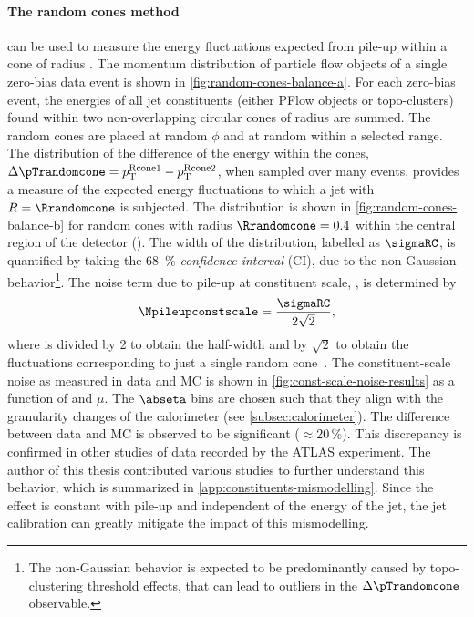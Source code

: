 \paragraph{The random cones method} can be used to measure the energy fluctuations expected from pile-up within a cone of radius \Rrandomcone. The momentum distribution of particle flow objects of a single zero-bias data event is shown in \cref{fig:random-cones-balance-a}.
For each zero-bias event, the energies of all jet constituents (either PFlow objects or topo-clusters) found within two non-overlapping circular cones of radius \Rrandomcone are summed.
The random cones are placed at random $\phi$ and at random \abseta within a selected range.
The distribution of the difference of the energy within the cones, $\Delta \pTrandomcone = p_{\text{T}}^{\text{Rcone1}} - p_{\text{T}}^\text{Rcone2}$, when sampled over many events, provides a measure of the expected energy fluctuations to which a jet with $R = \Rrandomcone$ is subjected.
The distribution is shown in \cref{fig:random-cones-balance-b} for random cones with radius $\Rrandomcone = 0.4$ within the central region of the detector (). The width of the distribution, labelled as $\sigmaRC$, is quantified by taking the \SI{68}{\percent} \emph{confidence interval} (CI), due to the non-Gaussian behavior\footnote{The non-Gaussian behavior is expected to be predominantly caused by topo-clustering threshold effects, that can lead to outliers in the $\Delta \pTrandomcone$ observable.}.
The noise term due to pile-up at constituent scale, \Npileupconstscale, is determined by
\begin{equation}
    \Npileupconstscale = \frac{\sigmaRC}{2\sqrt{2}},
\end{equation}
where \sigmaRC is divided by 2 to obtain the half-width and by $\sqrt{2}$ to obtain the fluctuations corresponding to just a single random cone~\cite{JETM-2018-05}.
The constituent-scale noise as measured in data and MC is shown in \cref{fig:const-scale-noise-results} as a function of \abseta and $\mu$.
The $\abseta$ bins are chosen such that they align with the granularity changes of the calorimeter (see \cref{subsec:calorimeter}). 
The difference between data and MC is observed to be significant ($\approx 20\,\%$). This discrepancy is confirmed in other studies of data recorded by the ATLAS experiment. The author of this thesis contributed various studies to further understand this behavior, which is summarized in \cref{app:constituents-mismodelling}.
Since the effect is constant with pile-up and independent of the energy of the jet, the jet calibration can greatly mitigate the impact of this mismodelling.

